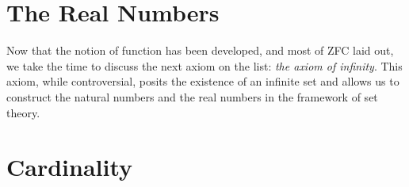     \chapter{The Real Numbers}
        Now that the notion of function has been developed, and most of ZFC laid
        out, we take the time to discuss the next axiom on the list:
        \textit{the axiom of infinity}. This axiom,
        while controversial, posits the existence of an infinite set and allows
        us to construct the natural numbers and the real numbers in the
        framework of set theory.
    \chapter{Cardinality}
        
    \renewcommand{\PATH}{\OLDPATH}
\endgroup